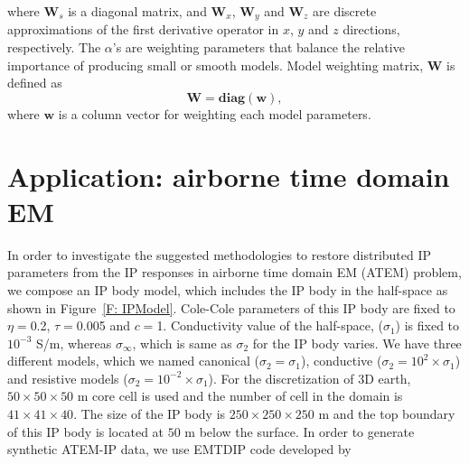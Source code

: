 \documentclass[a4paper, 11pt]{article}
\newcommand{\siginf}{\sigma_\infty}
\begin{document}
where $\mathbf{W}_s$ is a diagonal matrix, and $\mathbf{W}_x$, $\mathbf{W}_y$ and $\mathbf{W}_z$ are discrete approximations of the first derivative operator in $x$, $y$ and $z$ directions, respectively.  The $\alpha$'s are weighting parameters that balance the relative importance of producing small or smooth models. Model weighting matrix, $\mathbf{W}$ is defined as
\begin{equation}
    \mathbf{W} = \mathbf{diag}(\mathbf{w}),
    \label{eq: weight_mat}
\end{equation}
where $\mathbf{w}$ is a column vector for weighting each model parameters.



\section{Application: airborne time domain EM}
In order to investigate the suggested methodologies to restore distributed IP parameters from the IP responses in airborne time domain EM (ATEM) problem, we compose an IP body model, which includes the IP body in the half-space as shown in Figure~\ref{F: IPModel}. Cole-Cole parameters of this IP body are fixed to $\eta=$0.2, $\tau=$0.005 and $c=$1. Conductivity value of the half-space, ($\sigma_1$) is fixed to $10^{-3}$ S/m, whereas $\siginf$, which is same as $\sigma_2$ for the IP body varies. We have three different models, which we named canonical ($\sigma_2=\sigma_1$), conductive ($\sigma_2=10^2\times\sigma_1$) and resistive models ($\sigma_2=10^{-2}\times\sigma_1$).   For the discretization of 3D earth, $50\times50\times50$ m core cell is used and the number of cell in the domain is $41\times41\times40$. The size of the IP body is $250\times250\times250$ m and the top boundary of this IP body is located at $50$ m below the surface. In order to generate synthetic ATEM-IP data, we use EMTDIP code developed by \cite{Marchant2014}
\end{document}
